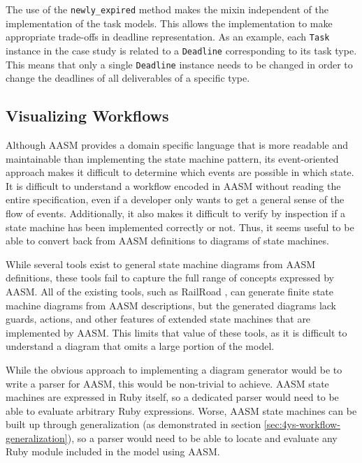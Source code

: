 \documentclass[document.tex]{subfiles}
\begin{document}
The use of the \verb!newly_expired! method makes the mixin independent of the implementation of the task models. This allows the implementation to make appropriate trade-offs in deadline representation. As an example, each \verb!Task! instance in the case study is related to a \verb!Deadline! corresponding to its task type. This means that only a single \verb!Deadline! instance needs to be changed in order to change the deadlines of all deliverables of a specific type.

\FloatBarrier


\subsection {Visualizing Workflows}
\label {sec:4ys-visualizing-workflows}

Although AASM provides a domain specific language that is more readable and maintainable than implementing the state machine pattern, its event-oriented approach makes it difficult to determine which events are possible in which state. It is difficult to understand a workflow encoded in AASM without reading the entire specification, even if a developer only wants to get a general sense of the flow of events. Additionally, it also makes it difficult to verify by inspection if a state machine has been implemented correctly or not. Thus, it seems useful to be able to convert back from AASM definitions to diagrams of state machines.

While several tools exist to general state machine diagrams from AASM definitions, these tools fail to capture the full range of concepts expressed by AASM. All of the existing tools, such as RailRoad \cite{railroad}, can generate finite state machine diagrams from AASM descriptions, but the generated diagrams lack guards, actions, and other features of extended state machines that are implemented by AASM. This limits that value of these tools, as it is difficult to understand a diagram that omits a large portion of the model.

While the obvious approach to implementing a diagram generator would be to write a parser for AASM, this would be non-trivial to achieve. AASM state machines are expressed in Ruby itself, so a dedicated parser would need to be able to evaluate arbitrary Ruby expressions. Worse, AASM state machines can be built up through generalization (as demonstrated in section \ref{sec:4ys-workflow-generalization}), so a parser would need to be able to locate and evaluate any Ruby module included in the model using AASM.
\end{document}
